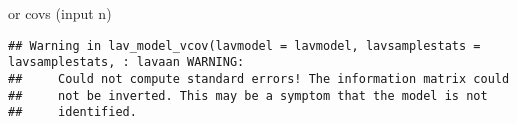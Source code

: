 \documentclass[
]{article}
\newenvironment{Shaded}{\begin{snugshade}}{\end{snugshade}}
\newcommand{\AttributeTok}[1]{\textcolor[rgb]{0.77,0.63,0.00}{#1}}
\newcommand{\DecValTok}[1]{\textcolor[rgb]{0.00,0.00,0.81}{#1}}
\newcommand{\FunctionTok}[1]{\textcolor[rgb]{0.00,0.00,0.00}{#1}}
\newcommand{\NormalTok}[1]{#1}
\newcommand{\OtherTok}[1]{\textcolor[rgb]{0.56,0.35,0.01}{#1}}
\newcommand{\SpecialCharTok}[1]{\textcolor[rgb]{0.00,0.00,0.00}{#1}}
\begin{document}
or covs (input n)

\begin{Shaded}
\end{Shaded}

\begin{verbatim}
## Warning in lav_model_vcov(lavmodel = lavmodel, lavsamplestats = lavsamplestats, : lavaan WARNING:
##     Could not compute standard errors! The information matrix could
##     not be inverted. This may be a symptom that the model is not
##     identified.
\end{verbatim}

\begin{Shaded}
\end{Shaded}
\end{document}
